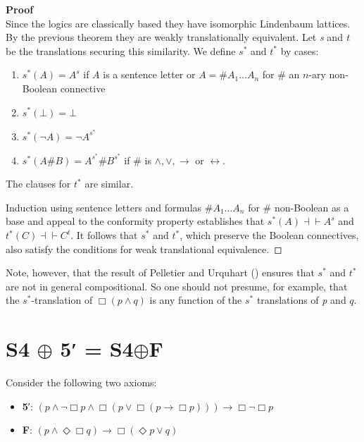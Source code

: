 \documentclass[
  10pt,
  letterpaper,
  DIV=11,
  numbers=noendperiod,
  twoside]{scrartcl}
\providecommand{\tightlist}{%
  \setlength{\itemsep}{0pt}\setlength{\parskip}{0pt}}\usepackage{longtable,booktabs,array}
\begin{document}
\textbf{Proof}\\
Since the logics are classically based they have isomorphic Lindenbaum
lattices. By the previous theorem they are weakly translationally
equivalent. Let \emph{s} and \emph{t} be the translations securing this
similarity. We define \(s^*\) and \(t^*\) by cases:

\begin{enumerate}
\def\labelenumi{\arabic{enumi}.}
\tightlist
\item
  \(s^*(A)=A^s\) if \(A\) is a sentence letter or
  \(A = {\#}A_1{\ldots}A_n\) for \({\#}\) an \(n\)-ary non-Boolean
  connective
\item
  \(s^{*}(\bot)=\bot\)
\item
  \(s^{*}(\neg A)= \neg A^{s^{*}}\)
\item
  \(s^{*}(A{\#}B) = A^{s^{*}}\!{\#} B^{s^{*}}\) if \({\#}\) is
  \(\wedge ,\vee ,\rightarrow\) or \(\leftrightarrow\).
\end{enumerate}

The clauses for \(t^*\) are similar.

Induction using sentence letters and formulas \({\#}A_1{\ldots}A_n\) for
\({\#}\) non-Boolean as a base and appeal to the conformity property
establishes that \(s^*\!(A){\dashv}{\vdash}A^s\) and
\(t^*(C){\dashv}{\vdash}C^t\). It follows that \(s^*\) and \(t^*\),
which preserve the Boolean connectives, also satisfy the conditions for
weak translational equivalence.~◻

Note, however, that the result of Pelletier and Urquhart
() ensures that \(s^*\) and
\(t^*\) are not in general compositional. So one should not presume, for
example, that the \(s^*\)-translation of \(\Box (p\wedge q)\) is any
function of the \(s^*\) translations of \emph{p} and \(q\).

\section{\texorpdfstring{S4 \(\oplus\) 5′ =
S4\(\oplus\)F}{S4 \textbackslash oplus 5′ = S4\textbackslash oplusF}}\label{s4-oplus-5-s4oplusf}

Consider the following two axioms:

\begin{itemize}
\tightlist
\item
  \textbf{5}′:
  \((p \wedge \neg \Box p \wedge \Box (p \vee \Box (p \rightarrow \Box p))) \rightarrow \Box \neg \Box p\)
\item
  \textbf{F}:
  \((p\wedge \Diamond\Box q) \rightarrow \Box (\Diamond p\vee q)\)
\end{itemize}
\end{document}
